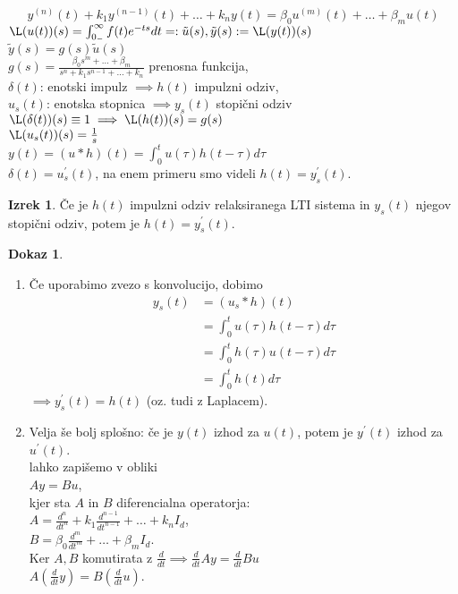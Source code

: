 \documentclass[a4paper, 12pt]{book}
\theoremstyle{definition}
\newtheorem{theorem}[counter]{Izrek}
\newtheorem{pro}[counter]{Dokaz}
\theoremstyle{remark}
\begin{document}

\begin{equation}
  \label{eq:sistem}
  y^{(n)}(t) + k_1 y^{(n-1)}(t) + \dots + k_n y(t) = \beta_0 u^{(m)}(t) + \dots + \beta_m u(t)
\end{equation}
$\L(u(t))(s) = \int_{0_-}^{\infty} f(t) e^{-ts} dt =: \tilde{u}(s), \\
\tilde{y}(s) := \L(y(t))(s)$ \\
$\tilde{y}(s) = g(s) \tilde{u}(s)$ \\
$g(s) = \frac{\beta_0 s^m + \dots + \beta_m}{s^n + k_1 s^{n-1} + \dots + k_n}$ prenosna funkcija, \\
$\delta(t)$: enotski impulz $\implies h(t)$ impulzni odziv, \\
$u_s(t)$: enotska stopnica $\implies y_s(t)$ stopični odziv \\
$\L(\delta(t))(s) \equiv 1 \implies \L(h(t))(s) = g(s)$ \\
$\L(u_s(t))(s) = \frac{1}{s}$ \\
$y(t) = (u * h)(t) = \int_0^t u(\tau) h(t-\tau) d\tau$ \\
$\delta(t) = u_s^{'}(t)$, na enem primeru smo videli $h(t) = y_s^{'}(t)$.
\begin{theorem}
  Če je $h(t)$ impulzni odziv relaksiranega LTI sistema in $y_s(t)$ njegov stopični odziv,
  potem je $h(t) = y_s^{'}(t)$.
\end{theorem}
\begin{pro} \text{} \\
  \begin{enumerate}[label=\alph*)]
      \item Če uporabimo zvezo s konvolucijo, dobimo
          \begin{align*}
              y_s(t) &= (u_s * h)(t) \\
              &= \int_0^t u(\tau) h(t-\tau) d\tau \\
              &= \int_0^t h(\tau) u(t-\tau) d\tau \\
              &= \int_0^t h(t) d\tau
          \end{align*}
          $\implies y_s^{'}(t) = h(t)$ (oz. tudi z Laplacem).
      \item Velja še bolj splošno: če je $y(t)$ izhod za $u(t)$,
          potem je $y^{'}(t)$ izhod za $u^{'}(t)$. \\
           lahko zapišemo v obliki \\
          $A y = B u$, \\
          kjer sta $A$ in $B$ diferencialna operatorja: \\
          $A = \frac{d^n}{dt^n} + k_1 \frac{d^{n-1}}{dt^{n-1}} + \dots + k_n I_d$, \\
          $B = \beta_0 \frac{d^m}{dt^m} + \dots + \beta_m I_d$. \\
          Ker $A, B$ komutirata z $\frac{d}{dt} \implies
          \frac{d}{dt} A y = \frac{d}{dt} B u$ \\
          $A \left(\frac{d}{dt} y\right) = B \left(\frac{d}{dt} u \right)$.
  \end{enumerate}
\end{pro}
\end{document}
